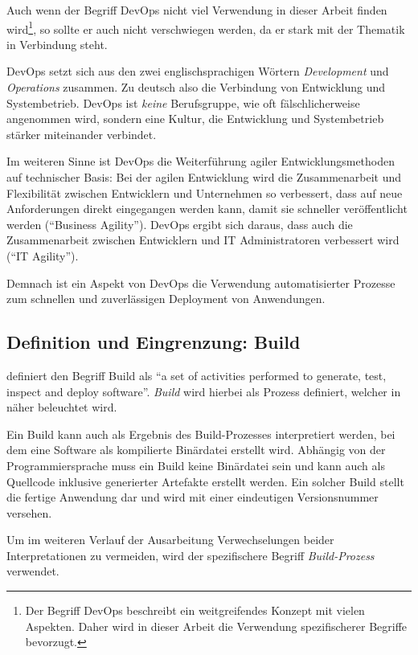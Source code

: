 Auch wenn der Begriff DevOps nicht viel Verwendung in dieser Arbeit finden wird\footnote{Der Begriff DevOps beschreibt ein weitgreifendes Konzept mit vielen Aspekten. Daher wird in dieser Arbeit die Verwendung spezifischerer Begriffe bevorzugt.}, so sollte er auch nicht verschwiegen werden, da er stark mit der Thematik in Verbindung steht.

DevOps setzt sich aus den zwei englischsprachigen Wörtern \emph{Development} und \emph{Operations} zusammen. Zu deutsch also die Verbindung von Entwicklung und Systembetrieb. DevOps ist \emph{keine} Berufsgruppe, wie oft fälschlicherweise angenommen wird, sondern eine Kultur, die Entwicklung und Systembetrieb stärker miteinander verbindet.

Im weiteren Sinne ist DevOps die Weiterführung agiler Entwicklungsmethoden auf technischer Basis: Bei der agilen Entwicklung wird die Zusammenarbeit und Flexibilität zwischen Entwicklern und Unternehmen so verbessert, dass auf neue Anforderungen direkt eingegangen werden kann, damit sie schneller veröffentlicht werden (``Business Agility''). DevOps ergibt sich daraus, dass auch die Zusammenarbeit zwischen Entwicklern und IT Administratoren verbessert wird (``IT Agility''). \citep[4f]{Chapman2014}

Demnach ist ein Aspekt von DevOps die Verwendung automatisierter Prozesse zum schnellen und zuverlässigen Deployment von Anwendungen.

\subsection{Definition und Eingrenzung: Build}
\label{subsec:build}

\citet[27]{Duvall2007} definiert den Begriff Build als ``a set of activities performed to generate, test, inspect and deploy software''. \emph{Build} wird hierbei als Prozess definiert, welcher in  näher beleuchtet wird.

Ein Build kann auch als Ergebnis des Build-Prozesses interpretiert werden, bei dem eine Software als kompilierte Binärdatei erstellt wird. Abhängig von der Programmiersprache muss ein Build keine Binärdatei sein und kann auch als Quellcode inklusive generierter Artefakte erstellt werden. Ein solcher Build stellt die fertige Anwendung dar und wird mit einer eindeutigen Versionsnummer versehen.

Um im weiteren Verlauf der Ausarbeitung Verwechselungen beider Interpretationen zu vermeiden, wird der spezifischere Begriff \emph{Build-Prozess} verwendet.

